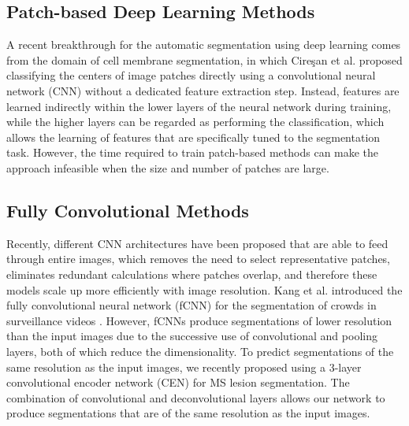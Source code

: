 \subsection{Patch-based Deep Learning Methods}

A recent breakthrough for the automatic segmentation using deep learning comes from
the domain of cell membrane segmentation, in which Cire\c{s}an et al.
\cite{Ciresan2012} proposed classifying the centers of image patches directly
using a convolutional neural network (CNN) \cite{LeCun1998} without a dedicated
feature extraction step. Instead, features are learned indirectly within the
lower layers of the neural network during training, while the higher layers can
be regarded as performing the classification, which allows the learning of
features that are specifically tuned to the segmentation task. However, the time
required to train patch-based methods can make the approach infeasible when the
size and number of patches are large.

\subsection{Fully Convolutional Methods}

Recently, different CNN architectures
\cite{long2015,ronneberger2015,brosch2015,kang2014fully} have been proposed that
are able to feed through entire images, which removes the need to select
representative patches, eliminates redundant calculations where patches overlap,
and therefore these models scale up more efficiently with image resolution. Kang
et al. introduced the fully convolutional neural network (fCNN) for the
segmentation of crowds in surveillance videos \cite{kang2014fully}. However, fCNNs produce
segmentations of lower resolution than the input images due to the successive
use of convolutional and pooling layers, both of which reduce the
dimensionality.
To predict segmentations of the same resolution as the input images, we recently
proposed using a 3-layer convolutional encoder network (CEN) \cite{brosch2015}
for MS lesion segmentation. The combination of convolutional \cite{LeCun1998}
and deconvolutional \cite{zeiler2011} layers allows our network to produce
segmentations that are of the same resolution as the input images.

